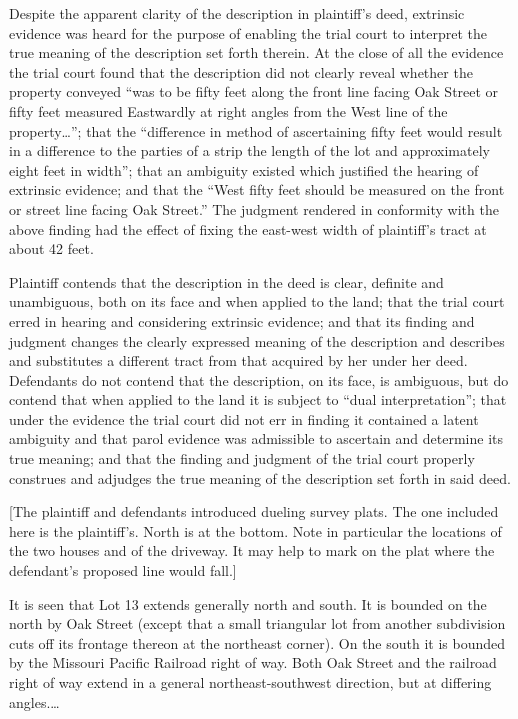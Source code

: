Despite the apparent clarity of the description in plaintiff's deed, extrinsic
evidence was heard for the purpose of enabling the trial court to interpret the
true meaning of the description set forth therein. At the close of all the
evidence the trial court found that the description did not clearly reveal
whether the property conveyed ``was to be fifty feet along the front line facing
Oak Street or fifty feet measured Eastwardly at right angles from the West line
of the property\dots''; that the ``difference in method of ascertaining fifty
feet would result in a difference to the parties of a strip the length of the
lot and approximately eight feet in width''; that an ambiguity existed which
justified the hearing of extrinsic evidence; and that the ``West fifty feet
should be measured on the front or street line facing Oak Street.'' The judgment
rendered in conformity with the above finding had the effect of fixing the
east-west width of plaintiff's tract at about 42 feet. 

Plaintiff contends that the description in the deed is clear, definite and
unambiguous, both on its face and when applied to the land; that the trial
court erred in hearing and considering extrinsic evidence; and that its finding
and judgment changes the clearly expressed meaning of the description and
describes and substitutes a different tract from that acquired by her under her
deed. Defendants do not contend that the description, on its face, is
ambiguous, but do contend that when applied to the land it is subject to ``dual
interpretation''; that under the evidence the trial court did not err in finding
it contained a latent ambiguity and that parol evidence was admissible to
ascertain and determine its true meaning; and that the finding and judgment of
the trial court properly construes and adjudges the true meaning of the
description set forth in said deed.

[The plaintiff and defendants introduced dueling survey plats. The one included
here is the plaintiff's. North is at the bottom. Note in particular the
locations of the two houses and of the driveway. It may help to mark on the
plat where the defendant's proposed line would fall.]

It is seen that Lot 13 extends generally north and south. It is bounded on the
north by Oak Street (except that a small triangular lot from another
subdivision cuts off its frontage thereon at the northeast corner). On the
south it is bounded by the Missouri Pacific Railroad right of way. Both Oak
Street and the railroad right of way extend in a general northeast-southwest
direction, but at differing angles.\ldots

